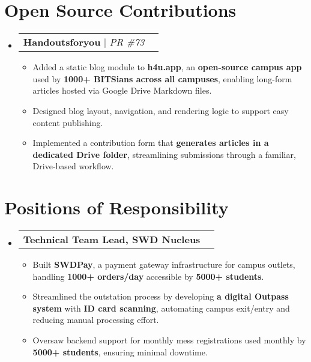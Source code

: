 \documentclass[letterpaper,9pt]{article}
\makeatletter
\newcommand{\resumeItem}[1]{\item\small{#1}}
\newcommand{\resumeProjectHeading}[2]{
    \item
    \begin{tabular*}{0.97\textwidth}{l@{\extracolsep{\fill}}r}
      \small#1 & #2 \\
    \end{tabular*}\vspace{-7pt}
}
\newcommand{\resumeSubHeadingListStart}{\begin{itemize}[leftmargin=*]}
\newcommand{\resumeSubHeadingListEnd}{\end{itemize}}
\newcommand{\resumeItemListStart}{\begin{itemize}}
\newcommand{\resumeItemListEnd}{\end{itemize}\vspace{-5pt}}
\makeatother
\begin{document}
\section{Open Source Contributions}
\resumeSubHeadingListStart
\resumeProjectHeading
    {
    \textbf{Handoutsforyou} 
        $|$ 
        \emph{PR \#73}
    }{}
  \resumeItemListStart
    \resumeItem{
        Added a static blog module to \textbf{h4u.app}, an \textbf{open-source campus app} used by \textbf{1000+ BITSians across all campuses}, enabling long-form articles hosted via Google Drive Markdown files.
    }
    \resumeItem{
        Designed blog layout, navigation, and rendering logic to support easy content publishing.
    }
    \resumeItem{
        Implemented a contribution form that \textbf{generates articles in a dedicated Drive folder}, streamlining submissions through a familiar, Drive-based workflow.
    }
  \resumeItemListEnd
\resumeSubHeadingListEnd


\section{Positions of Responsibility}
\resumeSubHeadingListStart
  \resumeProjectHeading
    {\textbf{Technical Team Lead, SWD Nucleus}}{}
  \resumeItemListStart
    \resumeItem{
        Built \textbf{SWDPay}, a payment gateway infrastructure for campus outlets, handling \textbf{1000+ orders/day} accessible by \textbf{5000+ students}.
    }
    \resumeItem{
        Streamlined the outstation process by developing \textbf{a digital Outpass system} with \textbf{ID card scanning}, automating campus exit/entry and reducing manual processing effort.
    }
    \resumeItem{
        Oversaw backend support for monthly mess registrations used monthly by \textbf{5000+ students}, ensuring minimal downtime.
    }
    \resumeItemListEnd
\resumeSubHeadingListEnd
\end{document}
